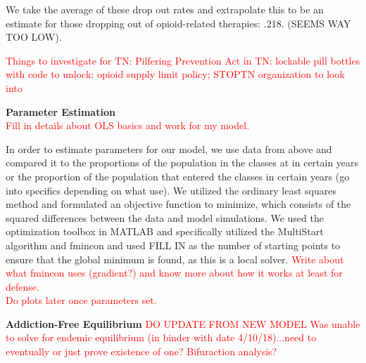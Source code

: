 \documentclass[12pt]{article}
\begin{document}
\begin{itemize}
We take the average of these drop out rates and extrapolate this to be an estimate for those dropping out of opioid-related therapies: .218. (SEEMS WAY TOO LOW).



\end{itemize}


\textcolor{red}{Things to investigate for TN: Pilfering Prevention Act in TN: lockable pill bottles with code to unlock; opioid supply limit policy; STOPTN organization to look into} 





\textbf{Parameter Estimation} \\
\textcolor{red}{Fill in details about OLS basics and work for my model.}

In order to estimate parameters for our model, we use data from above and compared it to the proportions of the population in the classes at in certain years or the proportion of the population that entered the classes in certain years (go into specifics depending on what use). We utilized the ordinary least squares method and formulated an objective function to minimize, which consists of the squared differences between the data and model simulations. We used the optimization toolbox in MATLAB and specifically utilized the MultiStart algorithm and fmincon and used FILL IN as the number of starting points to ensure that the global minimum is found, as this is a local solver. \textcolor{red}{Write about what fmincon uses (gradient?) and know more about how it works at least for defense.} \\

\textcolor{red}{Do plots later once parameters set.}






 \textbf{Addiction-Free Equilibrium} 
\textcolor{red}{DO UPDATE FROM NEW MODEL Was unable to solve for endemic equilibrium (in binder with date 4/10/18)...need to eventually or just prove existence of one? Bifuraction analysis?}
\end{document}
